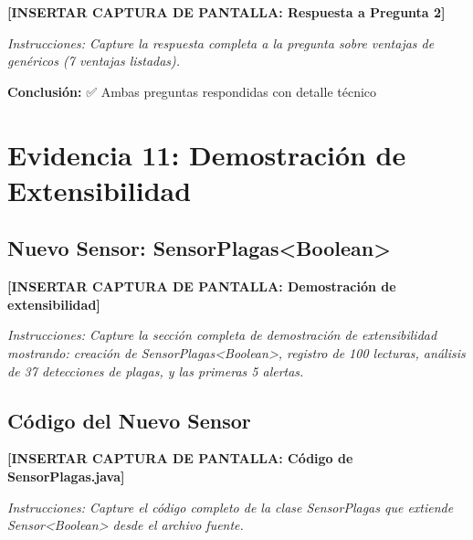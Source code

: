 \documentclass[12pt,a4paper]{article}
\begin{document}
\begin{tcolorbox}[colback=green!5,colframe=green!75!black,title=\textbf{Respuesta del Sistema}]
\vspace{0.5cm}
\textbf{[INSERTAR CAPTURA DE PANTALLA: Respuesta a Pregunta 2]}

\textit{Instrucciones: Capture la respuesta completa a la pregunta sobre ventajas de genéricos (7 ventajas listadas).}
\vspace{0.5cm}
\end{tcolorbox}

\textbf{Conclusión:} ✅ Ambas preguntas respondidas con detalle técnico


\section{Evidencia 11: Demostración de Extensibilidad}

\subsection{Nuevo Sensor: SensorPlagas<Boolean>}

\begin{tcolorbox}[colback=blue!5,colframe=blue!75!black,title=\textbf{DEMOSTRACIÓN DE EXTENSIBILIDAD}]
\vspace{0.5cm}
\textbf{[INSERTAR CAPTURA DE PANTALLA: Demostración de extensibilidad]}

\textit{Instrucciones: Capture la sección completa de demostración de extensibilidad mostrando: creación de SensorPlagas<Boolean>, registro de 100 lecturas, análisis de 37 detecciones de plagas, y las primeras 5 alertas.}
\vspace{0.5cm}
\end{tcolorbox}

\subsection{Código del Nuevo Sensor}

\begin{tcolorbox}[colback=gray!5,colframe=gray!75!black,title=\textbf{Código Java: SensorPlagas.java}]
\vspace{0.5cm}
\textbf{[INSERTAR CAPTURA DE PANTALLA: Código de SensorPlagas.java]}

\textit{Instrucciones: Capture el código completo de la clase SensorPlagas que extiende Sensor<Boolean> desde el archivo fuente.}
\vspace{0.5cm}
\end{tcolorbox}
\end{document}
